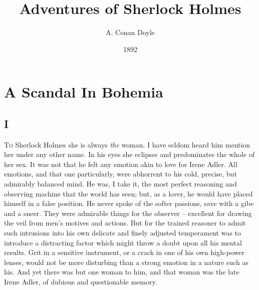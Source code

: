 
\newenvironment{letter}%
{\begin{list}{}{%
\setlength{\leftmargin}{1em}
\setlength{\rightmargin}{\leftmargin}
\setlength{\parsep}{0em}
\setlength{\listparindent}{\parindent}
}\item[]}
{\end{list}}

\newcommand{\chsec}[1]{
\vspace{0em plus 5\baselineskip}
\section*{\centering #1}}

\newcommand{\Chapter}[1]{
\chapter{#1}
\vspace{0em plus 2\baselineskip}}

\renewcommand{\thechapter}{\Roman{chapter}}

\frontmatter
\title{Adventures of Sherlock Holmes}
\author{A. Conan Doyle}
\date{1892}

\maketitle
\tableofcontents

\mainmatter
\Chapter{A Scandal In Bohemia}

\chsec{I}

\textsc{To} Sherlock Holmes she is always \textit{the} woman. I
have seldom heard him mention her under any
other name. In his eyes she eclipses and predominates
the whole of her sex. It was not that he
felt any emotion akin to love for Irene Adler. All emotions,
and that one particularly, were abhorrent to his cold, precise,
but admirably balanced mind. He was, I take it, the most
perfect reasoning and observing machine that the world has
seen; but, as a lover, he would have placed himself in a false
position. He never spoke of the softer passions, save with
a gibe and a sneer. They were admirable things for the
observer -- excellent for drawing the veil from men’s motives
and actions. But for the trained reasoner to admit such intrusions
into his own delicate and finely adjusted temperament
was to introduce a distracting factor which might throw
a doubt upon all his mental results. Grit in a sensitive instrument,
or a crack in one of his own high-power lenses, would
not be more disturbing than a strong emotion in a nature
such as his. And yet there was but one woman to him, and
that woman was the late Irene Adler, of dubious and questionable
memory.

